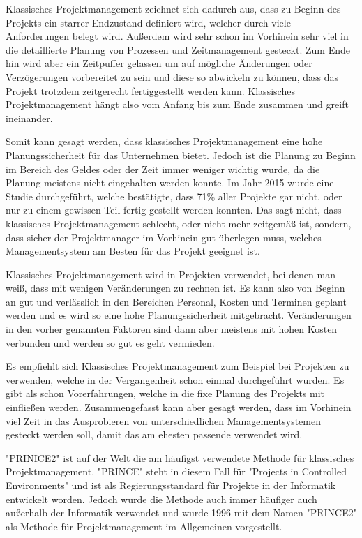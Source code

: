 

Klassisches Projektmanagement zeichnet sich dadurch aus, dass zu Beginn des Projekts ein starrer Endzustand definiert wird, welcher durch viele Anforderungen belegt wird. Außerdem wird sehr schon im Vorhinein sehr viel in die detaillierte Planung von Prozessen und Zeitmanagement gesteckt. Zum Ende hin wird aber ein Zeitpuffer gelassen um auf mögliche Änderungen oder Verzögerungen vorbereitet zu sein und diese so abwickeln zu können, dass das Projekt trotzdem zeitgerecht fertiggestellt werden kann. Klassisches Projektmanagement hängt also vom Anfang bis zum Ende zusammen und greift ineinander. 

Somit kann gesagt werden, dass klassisches Projektmanagement eine hohe Planungssicherheit für das Unternehmen bietet. Jedoch ist die Planung zu Beginn im Bereich des Geldes oder der Zeit immer weniger wichtig wurde, da die Planung meistens nicht eingehalten werden konnte. Im Jahr 2015 wurde eine Studie durchgeführt, welche bestätigte, dass 71\% aller Projekte gar nicht, oder nur zu einem gewissen Teil fertig gestellt werden konnten. Das sagt nicht, dass klassisches Projektmanagement schlecht, oder nicht mehr zeitgemäß ist, sondern, dass sicher der Projektmanager im Vorhinein gut überlegen muss, welches Managementsystem am Besten für das Projekt geeignet ist.  \cite{Projectman.}


Klassisches Projektmanagement wird in Projekten verwendet, bei denen man weiß, dass mit wenigen Veränderungen zu rechnen ist. Es kann also von Beginn an gut und verlässlich in den Bereichen Personal, Kosten und Terminen geplant werden und es wird so eine hohe Planungssicherheit mitgebracht. Veränderungen in den vorher genannten Faktoren sind dann aber meistens mit hohen Kosten verbunden und werden so gut es geht vermieden.

Es empfiehlt sich Klassisches Projektmanagement zum Beispiel bei Projekten zu verwenden, welche in der Vergangenheit schon einmal durchgeführt wurden. Es gibt als schon Vorerfahrungen, welche in die fixe Planung des Projekts mit einfließen werden. Zusammengefasst kann aber gesagt werden, dass im Vorhinein viel Zeit in das Ausprobieren von unterschiedlichen Managementsystemen gesteckt werden soll, damit das am ehesten passende verwendet wird. \cite{Projectman.}


"PRINICE2" ist auf der Welt die am häufigst verwendete Methode für klassisches Projektmanagement. "PRINCE" steht in diesem Fall für "Projects in Controlled Environments" und ist als Regierungsstandard für Projekte in der Informatik entwickelt worden. Jedoch wurde die Methode auch immer häufiger auch außerhalb der Informatik verwendet und wurde 1996 mit dem Namen "PRINCE2" als Methode für Projektmanagement im Allgemeinen vorgestellt.


